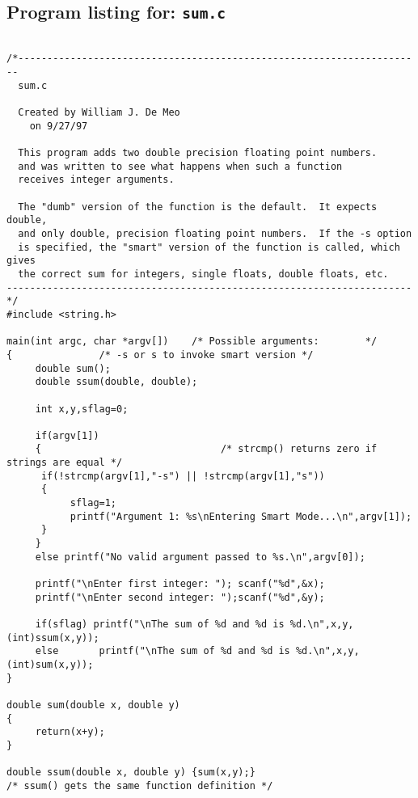 \documentclass{article}
\begin{document}
\subsection{Program listing for: {\tt sum.c}}
\begin{verbatim}

/*----------------------------------------------------------------------
  sum.c

  Created by William J. De Meo
    on 9/27/97

  This program adds two double precision floating point numbers.
  and was written to see what happens when such a function
  receives integer arguments.  

  The "dumb" version of the function is the default.  It expects double,
  and only double, precision floating point numbers.  If the -s option
  is specified, the "smart" version of the function is called, which gives
  the correct sum for integers, single floats, double floats, etc.
----------------------------------------------------------------------*/
#include <string.h>

main(int argc, char *argv[])	/* Possible arguments:        */
{				/* -s or s to invoke smart version */
     double sum();
     double ssum(double, double);

     int x,y,sflag=0;

     if(argv[1])
     {                               /* strcmp() returns zero if strings are equal */
	  if(!strcmp(argv[1],"-s") || !strcmp(argv[1],"s"))	
	  {
	       sflag=1;
	       printf("Argument 1: %s\nEntering Smart Mode...\n",argv[1]);
	  }
     }
     else printf("No valid argument passed to %s.\n",argv[0]);

     printf("\nEnter first integer: "); scanf("%d",&x);
     printf("\nEnter second integer: ");scanf("%d",&y);

     if(sflag) printf("\nThe sum of %d and %d is %d.\n",x,y,(int)ssum(x,y));
     else       printf("\nThe sum of %d and %d is %d.\n",x,y,(int)sum(x,y));
}

double sum(double x, double y)
{
     return(x+y);
}

double ssum(double x, double y) {sum(x,y);} 
/* ssum() gets the same function definition */
\end{verbatim}
\end{document}
